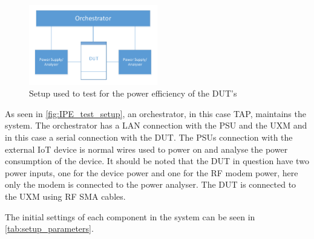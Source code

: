 \begin{figure}[H]
\centering
\includegraphics[width=0.5\textwidth]{figures/IPE_test_setup.pdf}
\caption{Setup used to test for the power efficiency of the \gls{DUT}'s}
\label{fig:IPE_test_setup}
\end{figure}


As seen in \autoref{fig:IPE_test_setup}, an orchestrator, in this case \gls{TAP}, maintains the system. The orchestrator has a \gls{LAN} connection with the \gls{PSU} and the UXM and in this case a serial connection with the DUT. The \gls{PSU}s connection with the external IoT device is normal wires used to power on and analyse the power consumption of the device. It should be noted that the \gls{DUT} in question have two power inputs, one for the device power and one for the RF modem power, here only the modem is connected to the power analyser. The DUT is connected to the UXM using RF SMA cables.

The initial settings of each component in the system can be seen in \autoref{tab:setup_parameters}.

